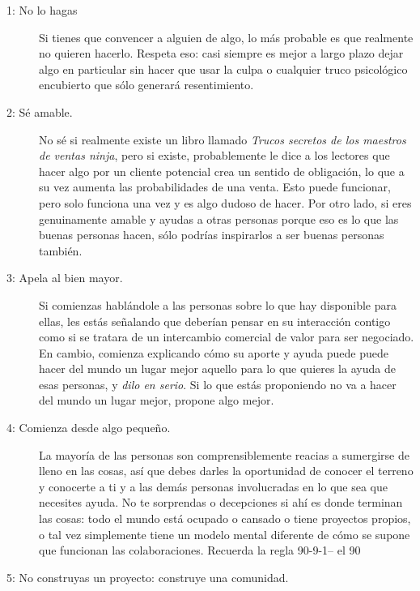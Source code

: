 \begin{description}
\item[1: No lo hagas]

Si tienes que convencer a alguien de algo,
lo más probable es que realmente no quieren hacerlo.
Respeta eso:
casi siempre es mejor a largo plazo dejar algo en particular sin hacer 
que usar la culpa o cualquier truco psicológico encubierto que sólo generará resentimiento.


\item[2: Sé amable.]
No sé si realmente existe un libro llamado
 \emph{Trucos secretos de los maestros de ventas ninja},
pero si existe,
probablemente le dice a los lectores que hacer algo por un cliente potencial 
crea un sentido de obligación,
lo que a su vez aumenta las probabilidades de una venta.
Esto puede funcionar, pero solo funciona una vez y es algo dudoso de hacer.
Por otro lado,
si eres genuinamente amable
y ayudas a otras personas porque eso es lo que las buenas personas hacen,
sólo podrías inspirarlos a ser buenas personas también.

\item[3: Apela al bien mayor.]
Si comienzas hablándole a las personas sobre lo que hay disponible para ellas,
les estás señalando que deberían pensar en su interacción contigo
como si se tratara de  un intercambio comercial de valor para ser negociado.
En cambio,
comienza explicando cómo su aporte y ayuda puede puede hacer del mundo un lugar mejor aquello para lo que quieres la ayuda de esas personas, y \emph{dilo en serio}.
Si lo que estás proponiendo no va a hacer del mundo un lugar mejor,
propone algo mejor.


\item[4: Comienza desde algo pequeño.]
La mayoría de las personas son comprensiblemente reacias a sumergirse de lleno en las cosas, 
así que debes darles  la oportunidad de conocer el terreno 
y conocerte a ti y a las demás personas involucradas
 en lo que sea que necesites ayuda.
No te sorprendas o decepciones si ahí es donde terminan las cosas:
todo el mundo está ocupado o cansado o tiene proyectos propios,
o tal vez simplemente tiene un modelo mental diferente de cómo se supone que funcionan las colaboraciones.
Recuerda la regla  90-9-1-- el 90%

\item[5: No construyas un proyecto: construye una comunidad.]


\end{description}
